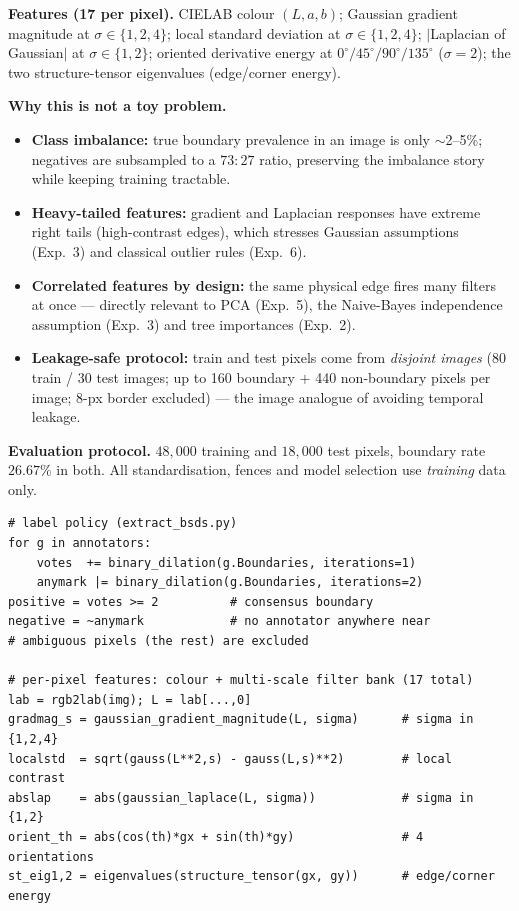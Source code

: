 \documentclass[11pt,a4paper]{article}
\begin{document}
\textbf{Features (17 per pixel).} CIELAB colour $(L,a,b)$; Gaussian gradient magnitude at $\sigma\in\{1,2,4\}$; local standard deviation at $\sigma\in\{1,2,4\}$; $|$Laplacian of Gaussian$|$ at $\sigma\in\{1,2\}$; oriented derivative energy at $0^\circ/45^\circ/90^\circ/135^\circ$ ($\sigma{=}2$); the two structure-tensor eigenvalues (edge/corner energy).

\textbf{Why this is not a toy problem.}
\begin{itemize}[nosep]
  \item \textbf{Class imbalance:} true boundary prevalence in an image is only $\sim$2--5\%; negatives are subsampled to a $73{:}27$ ratio, preserving the imbalance story while keeping training tractable.
  \item \textbf{Heavy-tailed features:} gradient and Laplacian responses have extreme right tails (high-contrast edges), which stresses Gaussian assumptions (Exp.~3) and classical outlier rules (Exp.~6).
  \item \textbf{Correlated features by design:} the same physical edge fires many filters at once --- directly relevant to PCA (Exp.~5), the Naive-Bayes independence assumption (Exp.~3) and tree importances (Exp.~2).
  \item \textbf{Leakage-safe protocol:} train and test pixels come from \emph{disjoint images} (80 train / 30 test images; up to 160 boundary $+$ 440 non-boundary pixels per image; 8-px border excluded) --- the image analogue of avoiding temporal leakage.
\end{itemize}

\textbf{Evaluation protocol.} $48{,}000$ training and $18{,}000$ test pixels, boundary rate $26.67\%$ in both. All standardisation, fences and model selection use \emph{training} data only.

\begin{lstlisting}
# label policy (extract_bsds.py)
for g in annotators:
    votes  += binary_dilation(g.Boundaries, iterations=1)
    anymark |= binary_dilation(g.Boundaries, iterations=2)
positive = votes >= 2          # consensus boundary
negative = ~anymark            # no annotator anywhere near
# ambiguous pixels (the rest) are excluded

# per-pixel features: colour + multi-scale filter bank (17 total)
lab = rgb2lab(img); L = lab[...,0]
gradmag_s = gaussian_gradient_magnitude(L, sigma)      # sigma in {1,2,4}
localstd  = sqrt(gauss(L**2,s) - gauss(L,s)**2)        # local contrast
abslap    = abs(gaussian_laplace(L, sigma))            # sigma in {1,2}
orient_th = abs(cos(th)*gx + sin(th)*gy)               # 4 orientations
st_eig1,2 = eigenvalues(structure_tensor(gx, gy))      # edge/corner energy
\end{lstlisting}
\end{document}
